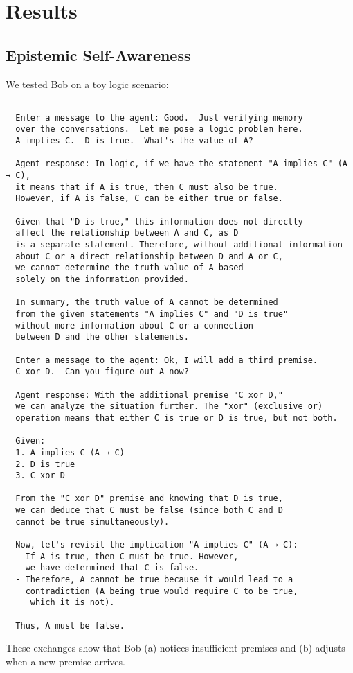 \documentclass[conference]{IEEEtran}
\begin{document}
\section{Results}

\subsection{Epistemic Self-Awareness}
We tested Bob on a toy logic scenario:
\begin{verbatim}

  Enter a message to the agent: Good.  Just verifying memory 
  over the conversations.  Let me pose a logic problem here.  
  A implies C.  D is true.  What's the value of A?
  
  Agent response: In logic, if we have the statement "A implies C" (A → C), 
  it means that if A is true, then C must also be true. 
  However, if A is false, C can be either true or false.
  
  Given that "D is true," this information does not directly 
  affect the relationship between A and C, as D 
  is a separate statement. Therefore, without additional information 
  about C or a direct relationship between D and A or C, 
  we cannot determine the truth value of A based 
  solely on the information provided.
  
  In summary, the truth value of A cannot be determined 
  from the given statements "A implies C" and "D is true" 
  without more information about C or a connection 
  between D and the other statements.

  Enter a message to the agent: Ok, I will add a third premise.  
  C xor D.  Can you figure out A now?

  Agent response: With the additional premise "C xor D," 
  we can analyze the situation further. The "xor" (exclusive or) 
  operation means that either C is true or D is true, but not both.
  
  Given:
  1. A implies C (A → C)
  2. D is true
  3. C xor D
  
  From the "C xor D" premise and knowing that D is true, 
  we can deduce that C must be false (since both C and D 
  cannot be true simultaneously).
  
  Now, let's revisit the implication "A implies C" (A → C):
  - If A is true, then C must be true. However,
    we have determined that C is false.
  - Therefore, A cannot be true because it would lead to a 
    contradiction (A being true would require C to be true,
     which it is not).
  
  Thus, A must be false.

\end{verbatim}
These exchanges show that Bob (a) notices insufficient premises and (b) adjusts when a new premise arrives. 
\end{document}
